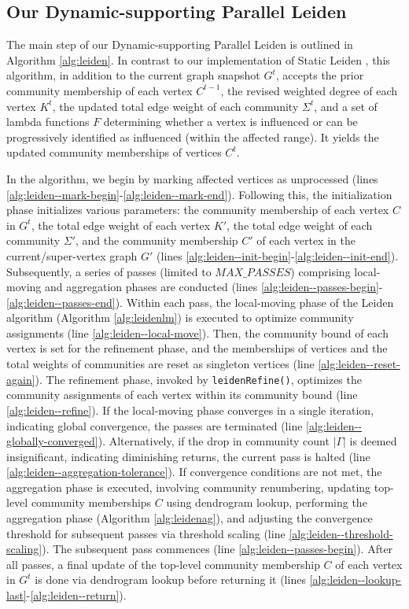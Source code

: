 \subsection{Our Dynamic-supporting Parallel Leiden}
\label{sec:our-leiden}

The main step of our Dynamic-supporting Parallel Leiden is outlined in Algorithm \ref{alg:leiden}. In contrast to our implementation of Static Leiden \cite{sahu2023gveleiden}, this algorithm, in addition to the current graph snapshot $G^t$, accepts the prior community membership of each vertex $C^{t-1}$, the revised weighted degree of each vertex $K^t$, the updated total edge weight of each community $\Sigma^t$, and a set of lambda functions $F$ determining whether a vertex is influenced or can be progressively identified as influenced (within the affected range). It yields the updated community memberships of vertices $C^t$.



In the algorithm, we begin by marking affected vertices as unprocessed (lines \ref{alg:leiden--mark-begin}-\ref{alg:leiden--mark-end}). Following this, the initialization phase initializes various parameters: the community membership of each vertex $C$ in $G^t$, the total edge weight of each vertex $K'$, the total edge weight of each community $\Sigma'$, and the community membership $C'$ of each vertex in the current/super-vertex graph $G'$ (lines \ref{alg:leiden--init-begin}-\ref{alg:leiden--init-end}). Subsequently, a series of passes (limited to $MAX\_PASSES$) comprising local-moving and aggregation phases are conducted (lines \ref{alg:leiden--passes-begin}-\ref{alg:leiden--passes-end}). Within each pass, the local-moving phase of the Leiden algorithm (Algorithm \ref{alg:leidenlm}) is executed to optimize community assignments (line \ref{alg:leiden--local-move}). Then, the community bound of each vertex is set for the refinement phase, and the memberships of vertices and the total weights of communities are reset as singleton vertices (line \ref{alg:leiden--reset-again}). The refinement phase, invoked by \texttt{leidenRefine()}, optimizes the community assignments of each vertex within its community bound (line \ref{alg:leiden--refine}). If the local-moving phase converges in a single iteration, indicating global convergence, the passes are terminated (line \ref{alg:leiden--globally-converged}). Alternatively, if the drop in community count $|\Gamma|$ is deemed insignificant, indicating diminishing returns, the current pass is halted (line \ref{alg:leiden--aggregation-tolerance}). If convergence conditions are not met, the aggregation phase is executed, involving community renumbering, updating top-level community memberships $C$ using dendrogram lookup, performing the aggregation phase (Algorithm \ref{alg:leidenag}), and adjusting the convergence threshold for subsequent passes via threshold scaling (line \ref{alg:leiden--threshold-scaling}). The subsequent pass commences (line \ref{alg:leiden--passes-begin}). After all passes, a final update of the top-level community membership $C$ of each vertex in $G^t$ is done via dendrogram lookup before returning it (lines \ref{alg:leiden--lookup-last}-\ref{alg:leiden--return}).


